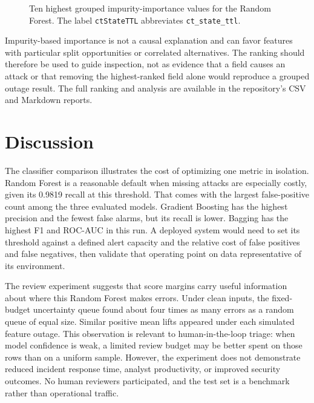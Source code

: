 \documentclass[conference]{IEEEtran}
\begin{document}
\begin{figure}[t]
\centering
{}
\caption{Ten highest grouped impurity-importance values for the Random Forest. The label \texttt{ctStateTTL} abbreviates \texttt{ct\_state\_ttl}.}
\label{fig:importance}
\end{figure}

Impurity-based importance is not a causal explanation and can favor features with particular split opportunities or correlated alternatives. The ranking should therefore be used to guide inspection, not as evidence that a field causes an attack or that removing the highest-ranked field alone would reproduce a grouped outage result. The full ranking and analysis are available in the repository's CSV and Markdown reports.

\section{Discussion}
The classifier comparison illustrates the cost of optimizing one metric in isolation. Random Forest is a reasonable default when missing attacks are especially costly, given its 0.9819 recall at this threshold. That comes with the largest false-positive count among the three evaluated models. Gradient Boosting has the highest precision and the fewest false alarms, but its recall is lower. Bagging has the highest F1 and ROC-AUC in this run. A deployed system would need to set its threshold against a defined alert capacity and the relative cost of false positives and false negatives, then validate that operating point on data representative of its environment.

The review experiment suggests that score margins carry useful information about where this Random Forest makes errors. Under clean inputs, the fixed-budget uncertainty queue found about four times as many errors as a random queue of equal size. Similar positive mean lifts appeared under each simulated feature outage. This observation is relevant to human-in-the-loop triage: when model confidence is weak, a limited review budget may be better spent on those rows than on a uniform sample. However, the experiment does not demonstrate reduced incident response time, analyst productivity, or improved security outcomes. No human reviewers participated, and the test set is a benchmark rather than operational traffic.
\end{document}
